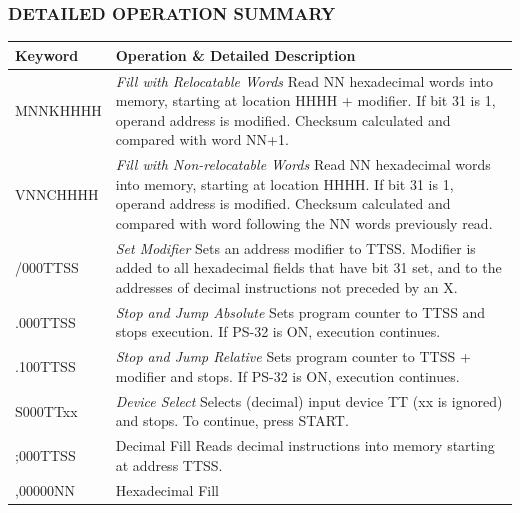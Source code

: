 \subsubsection*{DETAILED OPERATION SUMMARY}
\vspace{-1.2em} %
\begin{longtable}{l p{9.5cm}}
\toprule
\textbf{Keyword} & \textbf{Operation \& Detailed Description} \\
\midrule
\endhead
\bottomrule
\endfoot

MNNKHHHH  & \textit{Fill with Relocatable Words} \newline
            Read NN hexadecimal words into memory, starting at location HHHH + modifier. If bit 31 is 1, operand address is modified. Checksum calculated and compared with word NN+1. \\
\addlinespace
VNNCHHHH  & \textit{Fill with Non-relocatable Words} \newline
            Read NN hexadecimal words into memory, starting at location HHHH. If bit 31 is 1, operand address is modified. Checksum calculated and compared with word following the NN words previously read. \\
\addlinespace
/000TTSS  & \textit{Set Modifier} \newline
            Sets an address modifier to TTSS. Modifier is added to all hexadecimal fields that have bit 31 set, and to the addresses of decimal instructions not preceded by an X. \\
\addlinespace
.000TTSS  & \textit{Stop and Jump Absolute} \newline
            Sets program counter to TTSS and stops execution. If PS-32 is ON, execution continues. \\
\addlinespace
.100TTSS  & \textit{Stop and Jump Relative} \newline
            Sets program counter to TTSS + modifier and stops. If PS-32 is ON, execution continues. \\
\addlinespace
S000TTxx  & \textit{Device Select} \newline
            Selects (decimal) input device TT (xx is ignored) and stops. To continue, press START. \\
\addlinespace
;000TTSS  & Decimal Fill \newline
            Reads decimal instructions into memory starting at address TTSS. \\
\addlinespace
,00000NN  & Hexadecimal Fill \newline

\end{longtable}
